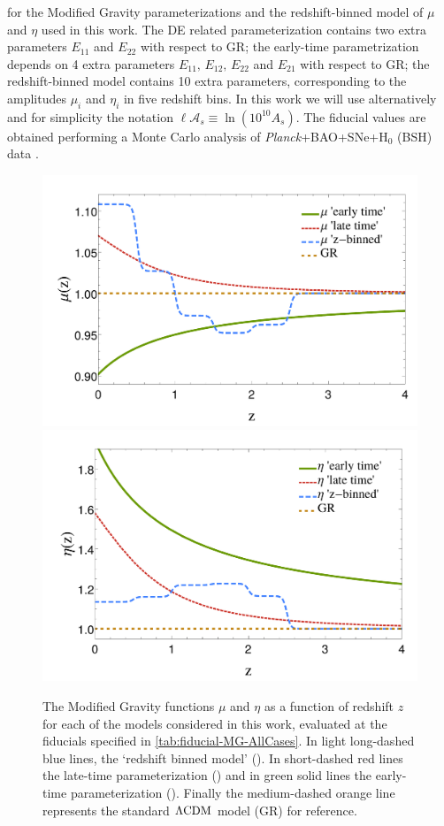 \begin{table}[htbp]
{for the Modified
Gravity parameterizations and the redshift-binned model of $\mu$
and $\eta$ used in this work. The DE related parameterization contains
two extra parameters $E_{11}$ and $E_{22}$ with respect to GR; the
early-time parametrization depends on 4 extra parameters
$E_{11},\,E_{12},\,E_{22}$
and $E_{21}$ with respect to GR; the redshift-binned model contains
10 extra parameters, corresponding to the amplitudes $\mu_{i}$ and
$\eta_{i}$ in five redshift bins. In this work we will
use alternatively and for simplicity the notation $\ell \mathcal{A}_s \equiv \ln(10^{10} A_{s})$.
The fiducial values are obtained
performing a Monte Carlo analysis of {\it Planck}+BAO+SNe+H$_{0}$ (BSH) data
\cite{planck_collaboration_planck_2016}.}
\label{tab:DEfid} 
\end{table}


\begin{figure}[htbp]
	\centering{}\begin{center}
		\includegraphics[width=0.45\linewidth]{Chapters/linear-nonlinear-MG-forecasts/figures/fiducials/muFiducialsPlot}
		\includegraphics[width=0.45\linewidth]{Chapters/linear-nonlinear-MG-forecasts/figures/fiducials/etaFiducialsPlot}
	\end{center}
	\caption[Modified Gravity functions $\eta$ and $\mu$.]{\label{fig:fidplot}
The Modified Gravity functions $\mu$ and $\eta$ as a function of redshift $z$ for each of the models considered in this work, evaluated at the fiducials specified in \cref{tab:fiducial-MG-AllCases}. 
In light long-dashed blue lines, the `redshift binned model' (). In short-dashed red lines the late-time parameterization () and in green solid lines the early-time parameterization (). Finally the medium-dashed orange line represents the standard $\Lambda\mathrm{CDM}$ model (GR) for reference.
		}
\end{figure}



